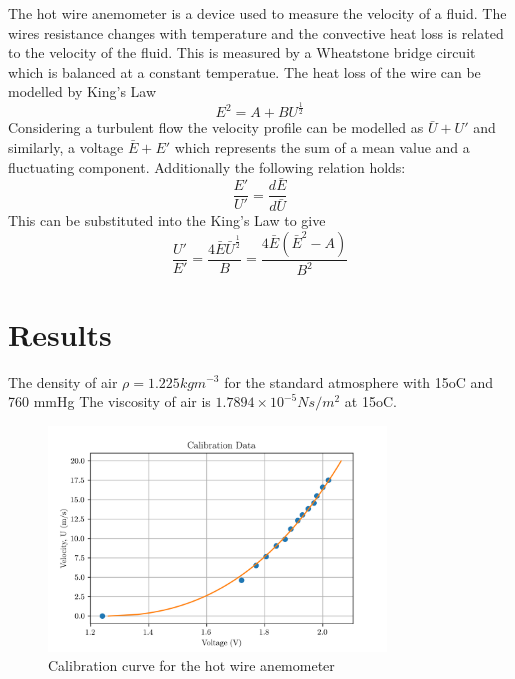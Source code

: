 \documentclass{article}
\begin{document}
The hot wire anemometer is a device used to measure the velocity of a fluid.
The wires resistance changes with temperature and the convective heat loss is related to the velocity of the fluid.
This is measured by a Wheatstone bridge circuit which is balanced at a constant temperatue.
The heat loss of the wire can be modelled by King's Law
\begin{equation}
    E^2 = A + B U^{\frac{1}{2}}
\end{equation}
Considering a turbulent flow the velocity profile can be modelled as $\bar{U} + U'$ and similarly, a voltage $\bar{E} + E'$ which represents the sum of a mean value and a fluctuating component.
Additionally the following relation holds:
\begin{equation}
    \frac{E'}{U'} = \frac{d\bar{E}}{d\bar{U}}
\end{equation}
This can be substituted into the King's Law to give
\begin{equation}
    \frac{U'}{E'} = \frac{4\bar{E}\bar{U}^{\frac{1}{2}}}{B} = \frac{4\bar{E}(\bar{E}^2 - A)}{B^2}
    \label{eq:small_kings}
\end{equation}


\section{Results}

The density of air $\rho = 1.225kgm^{-3}$ for the standard atmosphere with 15oC and 760 mmHg
The viscosity of air is $1.7894 \times 10^{-5} Ns/m^2$ at 15oC.

\begin{figure}[H]
    \centering
    \includegraphics[width=0.8\textwidth]{calibration.png}
    \caption{Calibration curve for the hot wire anemometer}
    \label{fig:calibration}
\end{figure}
\end{document}
